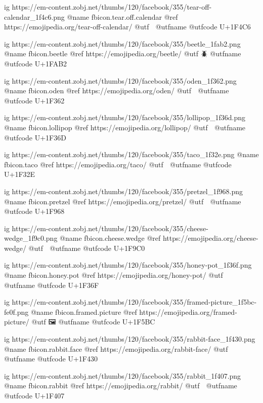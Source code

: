 	ig https://em-content.zobj.net/thumbs/120/facebook/355/tear-off-calendar_1f4c6.png
	@name fbicon.tear.off.calendar
	@ref https://emojipedia.org/tear-off-calendar/
	@utf 📆
	@utfname
	@utfcode U+1F4C6

	ig https://em-content.zobj.net/thumbs/120/facebook/355/beetle_1fab2.png
	@name fbicon.beetle
	@ref https://emojipedia.org/beetle/
	@utf 🪲
	@utfname
	@utfcode U+1FAB2

	ig https://em-content.zobj.net/thumbs/120/facebook/355/oden_1f362.png
	@name fbicon.oden
	@ref https://emojipedia.org/oden/
	@utf 🍢
	@utfname
	@utfcode U+1F362

	ig https://em-content.zobj.net/thumbs/120/facebook/355/lollipop_1f36d.png
	@name fbicon.lollipop
	@ref https://emojipedia.org/lollipop/
	@utf 🍭
	@utfname
	@utfcode U+1F36D

	ig https://em-content.zobj.net/thumbs/120/facebook/355/taco_1f32e.png
	@name fbicon.taco
	@ref https://emojipedia.org/taco/
	@utf 🌮
	@utfname
	@utfcode U+1F32E

	ig https://em-content.zobj.net/thumbs/120/facebook/355/pretzel_1f968.png
	@name fbicon.pretzel
	@ref https://emojipedia.org/pretzel/
	@utf 🥨
	@utfname
	@utfcode U+1F968

	ig https://em-content.zobj.net/thumbs/120/facebook/355/cheese-wedge_1f9c0.png
	@name fbicon.cheese.wedge
	@ref https://emojipedia.org/cheese-wedge/
	@utf 🧀
	@utfname
	@utfcode U+1F9C0

	ig https://em-content.zobj.net/thumbs/120/facebook/355/honey-pot_1f36f.png
	@name fbicon.honey.pot
	@ref https://emojipedia.org/honey-pot/
	@utf 🍯
	@utfname
	@utfcode U+1F36F

	ig https://em-content.zobj.net/thumbs/120/facebook/355/framed-picture_1f5bc-fe0f.png
	@name fbicon.framed.picture
	@ref https://emojipedia.org/framed-picture/
	@utf 🖼
	@utfname
	@utfcode U+1F5BC

	ig https://em-content.zobj.net/thumbs/120/facebook/355/rabbit-face_1f430.png
	@name fbicon.rabbit.face
	@ref https://emojipedia.org/rabbit-face/
	@utf 🐰
	@utfname
	@utfcode U+1F430

	ig https://em-content.zobj.net/thumbs/120/facebook/355/rabbit_1f407.png
	@name fbicon.rabbit
	@ref https://emojipedia.org/rabbit/
	@utf 🐇
	@utfname
	@utfcode U+1F407



\fi

